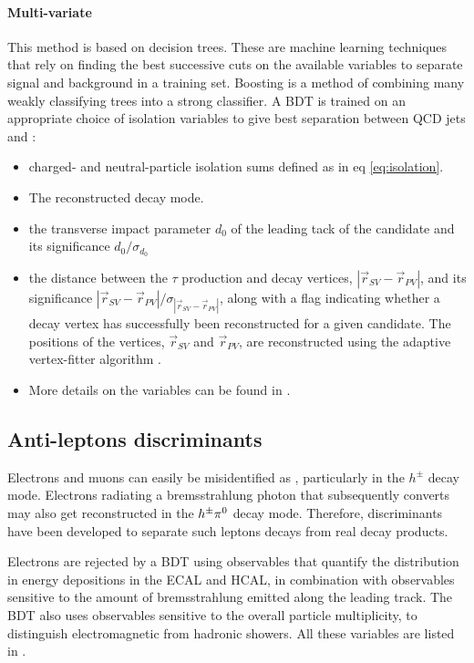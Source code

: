\paragraph{Multi-variate} This method is based on decision trees. These are machine learning techniques that rely on finding the best successive cuts on the available variables to separate signal and background in a training set. Boosting is a method of combining many weakly classifying trees into a strong classifier. A BDT is trained on an appropriate choice of isolation variables to give best separation between QCD jets and \tauh : 
    \begin{itemize}
        \item charged- and neutral-particle isolation sums defined as in eq \ref{eq:isolation}.
        \item The reconstructed decay mode.
        \item the transverse impact parameter $d_0$ of the leading tack of the \tauh candidate and its significance $d_0 / \sigma_{d_0}$
        \item the distance between the $\tau$ production and decay vertices, $|\Vec{r}_{SV} - \Vec{r}_{PV}|$, and its significance $|\Vec{r}_{SV} - \Vec{r}_{PV}|/\sigma_{|\Vec{r}_{SV} - \Vec{r}_{PV}|}$, along with a flag indicating whether a decay vertex has successfully been reconstructed for a given \tauh candidate. The positions of the vertices, $\Vec{r}_{SV}$ and $\Vec{r}_{PV}$, are reconstructed using the adaptive vertex-fitter algorithm \cite{Waltenberger_2007}.
        \item More details on the variables can be found in \cite{tauh_reconstruction}.
    \end{itemize}

\subsection{Anti-leptons discriminants}

Electrons and muons can easily be misidentified as \tauh, particularly in the $h^{\pm}$ decay mode. Electrons radiating a bremsstrahlung photon that subsequently converts may also get reconstructed in the $h^{\pm}\pi^{0}$ decay mode. Therefore, discriminants have been developed to separate such leptons decays from real \tauh decay products.

Electrons are rejected by a BDT using observables that quantify the distribution in energy depositions in the ECAL and HCAL, in combination with observables sensitive to the amount of bremsstrahlung emitted along the leading track. The BDT also uses observables sensitive to the overall particle multiplicity, to distinguish electromagnetic from hadronic showers.
All these variables are listed in \cite{tauh_reconstruction}.
    
